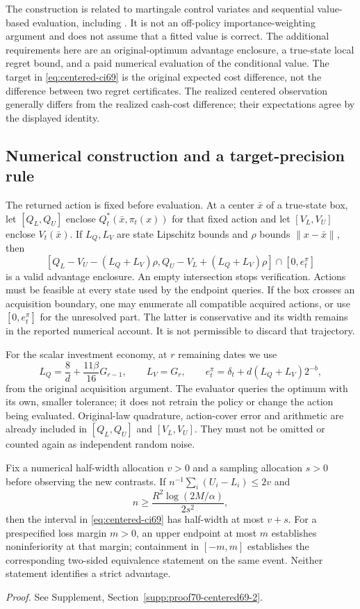 The construction is related to martingale control variates and sequential value-based evaluation, including \citet{jiang2016}. It is not an off-policy importance-weighting argument and does not assume that a fitted value is correct. The additional requirements here are an original-optimum advantage enclosure, a true-state local regret bound, and a paid numerical evaluation of the conditional value. The target in \eqref{eq:centered-ci69} is the original expected cost difference, not the difference between two regret certificates. The realized centered observation generally differs from the realized cash-cost difference; their expectations agree by the displayed identity.

\subsection{Numerical construction and a target-precision rule}
The returned action is fixed before evaluation. At a center $\bar x$ of a true-state box, let $[Q_L,Q_U]$ enclose $Q_t^*(\bar x,\pi_t(x))$ for that fixed action and let $[V_L,V_U]$ enclose $V_t(\bar x)$. If $L_Q,L_V$ are state Lipschitz bounds and $\rho$ bounds $\|x-\bar x\|$, then
\begin{equation}\label{eq:advantage-box69}
 [Q_L-V_U-(L_Q+L_V)\rho,
   Q_U-V_L+(L_Q+L_V)\rho]\cap[0,e_t^\pi]
\end{equation}
is a valid advantage enclosure. An empty intersection stops verification. Actions must be feasible at every state used by the endpoint queries. If the box crosses an acquisition boundary, one may enumerate all compatible acquired actions, or use $[0,e_t^\pi]$ for the unresolved part. The latter is conservative and its width remains in the reported numerical account. It is not permissible to discard that trajectory.

For the scalar investment economy, at $r$ remaining dates we use
\[
 L_Q=\frac8d+\frac{11\beta}{16}G_{r-1},\qquad L_V=G_r,
 \qquad e_t^\pi=\delta_t+d(L_Q+L_V)2^{-b},
\]
from the original acquisition argument. The evaluator queries the optimum with its own, smaller tolerance; it does not retrain the policy or change the action being evaluated. Original-law quadrature, action-cover error and arithmetic are already included in $[Q_L,Q_U]$ and $[V_L,V_U]$. They must not be omitted or counted again as independent random noise.

\begin{corollary}\label{cor:precision69}
Fix a numerical half-width allocation $v>0$ and a sampling allocation $s>0$ before observing the new contrasts. If $n^{-1}\sum_i(U_i-L_i)\le2v$ and
\[
 n\ge\frac{R^2\log(2M/\alpha)}{2s^2},
\]
then the interval in \eqref{eq:centered-ci69} has half-width at most $v+s$. For a prespecified loss margin $m>0$, an upper endpoint at most $m$ establishes noninferiority at that margin; containment in $[-m,m]$ establishes the corresponding two-sided equivalence statement on the same event. Neither statement identifies a strict advantage.
\end{corollary}
\noindent\emph{Proof.} See Supplement, Section~\ref{supp:proof70-centered69-2}.


